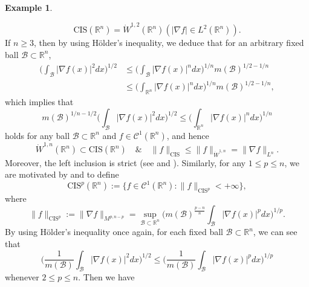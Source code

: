 \documentclass[10pt, reqno]{amsart}
\theoremstyle{definition}
\newtheorem{example}[theorem]{Example}
\theoremstyle{remark}
\numberwithin{equation}{section}
\begin{document}
\begin{example}
\begin{enumerate}
\begin{equation*}
\mathrm{CIS}(\mathbb R^n)=\dot{W}^{1,2}(\mathbb R^n)(|\nabla f|\in L^2(\mathbb R^n)).
\end{equation*}
If $n\geq3$, then by using H\"{o}lder's inequality, we deduce that for an arbitrary fixed ball $\mathcal{B}\subset\mathbb R^n$,
\begin{equation*}
\begin{split}
\bigg(\int_{\mathcal{B}}|\nabla f(x)|^2dx\bigg)^{1/2}
&\leq\bigg(\int_{\mathcal{B}}|\nabla f(x)|^ndx\bigg)^{1/n}m(\mathcal{B})^{1/2-1/n}\\
&\leq\bigg(\int_{\mathbb R^n}|\nabla f(x)|^ndx\bigg)^{1/n}m(\mathcal{B})^{1/2-1/n},
\end{split}
\end{equation*}
which implies that
\begin{equation*}
m(\mathcal{B})^{1/n-1/2}\bigg(\int_{\mathcal{B}}|\nabla f(x)|^2dx\bigg)^{1/2}\leq \bigg(\int_{\mathbb R^n}|\nabla f(x)|^ndx\bigg)^{1/n}
\end{equation*}
holds for any ball $\mathcal{B}\subset\mathbb R^n$ and $f\in \mathcal{C}^{1}(\mathbb R^n)$, and hence
\begin{equation*}
\dot{W}^{1,n}(\mathbb R^n)\subset\mathrm{CIS}(\mathbb R^n)\quad \&\quad \|f\|_{\mathrm{CIS}}\leq\|f\|_{\dot{W}^{1,n}}=\|\nabla f\|_{L^n}.
\end{equation*}
Moreover, the left inclusion is strict (see \cite[Theorem 4.1]{xiao1} and \cite[Theorem 1.4]{xiao2}). Similarly, for any $1\leq p\leq n$, we are motivated by \cite{xiao1} and \cite{xiao2} to define
\begin{equation*}
\mathrm{CIS}^p(\mathbb R^n):=\bigg\{f\in\mathcal{C}^{1}(\mathbb R^n):\|f\|_{\mathrm{CIS}^p}<+\infty\bigg\},
\end{equation*}
where
\begin{equation*}
\big\|f\big\|_{\mathrm{CIS}^p}:=\big\|\nabla f\big\|_{M^{p,n-p}}
=\sup_{\mathcal{B}\subset\mathbb R^n}\bigg(m(\mathcal{B})^{\frac{p-n}{n}}\int_{\mathcal{B}}|\nabla f(x)|^pdx\bigg)^{1/p}.
\end{equation*}
By using H\"{o}lder's inequality once again, for each fixed ball $\mathcal{B}\subset\mathbb R^n$, we can see that
\begin{equation*}
\bigg(\frac{1}{m(\mathcal{B})}\int_{\mathcal{B}}|\nabla f(x)|^2dx\bigg)^{1/2}\leq\bigg(\frac{1}{m(\mathcal{B})}\int_{\mathcal{B}}|\nabla f(x)|^pdx\bigg)^{1/p}
\end{equation*}
whenever $2\leq p\leq n$. Then we have
\begin{equation*}

\end{equation*}
\end{enumerate}
\end{example}
\end{document}
